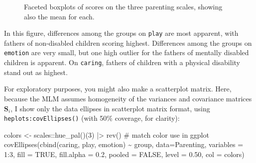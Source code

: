 \documentclass[
  letterpaper,
  10pt,
  krantz2]{krantz}
\makeatletter
\newenvironment{Shaded}{\begin{snugshade}}{\end{snugshade}}
\newcommand{\AttributeTok}[1]{\textcolor[rgb]{0.40,0.45,0.13}{#1}}
\newcommand{\CommentTok}[1]{\textcolor[rgb]{0.37,0.37,0.37}{#1}}
\newcommand{\ConstantTok}[1]{\textcolor[rgb]{0.56,0.35,0.01}{#1}}
\newcommand{\DecValTok}[1]{\textcolor[rgb]{0.68,0.00,0.00}{#1}}
\newcommand{\FloatTok}[1]{\textcolor[rgb]{0.68,0.00,0.00}{#1}}
\newcommand{\FunctionTok}[1]{\textcolor[rgb]{0.28,0.35,0.67}{#1}}
\newcommand{\NormalTok}[1]{\textcolor[rgb]{0.00,0.23,0.31}{#1}}
\newcommand{\OtherTok}[1]{\textcolor[rgb]{0.00,0.23,0.31}{#1}}
\newcommand{\SpecialCharTok}[1]{\textcolor[rgb]{0.37,0.37,0.37}{#1}}
\newenvironment{kframe}{%
  \medskip{}
  \setlength{\fboxsep}{.8em}
  \def\at@end@of@kframe{}%
  \ifinner\ifhmode%
  \def\at@end@of@kframe{\end{minipage}}%
  \begin{minipage}{\columnwidth}%
  \fi\fi%
  \def\FrameCommand##1{\hskip\@totalleftmargin \hskip-\fboxsep
  \colorbox{shadecolor}{##1}\hskip-\fboxsep
      \hskip-\linewidth \hskip-\@totalleftmargin \hskip\columnwidth}%
  \MakeFramed {\advance\hsize-\width
    \@totalleftmargin\z@ \linewidth\hsize
    \@setminipage}}%
{\par\unskip\endMakeFramed%
  \at@end@of@kframe}
\renewenvironment{Shaded}{\begin{kframe}}{\end{kframe}}
\makeatother
\begin{document}
\begin{figure}[H]


\caption{\label{fig-parenting-boxpl}Faceted boxplots of scores on the
three parenting scales, showing also the mean for each.}

\end{figure}%

In this figure, differences among the groups on \texttt{play} are most
apparent, with fathers of non-disabled children scoring highest.
Differences among the groups on \texttt{emotion} are very small, but one
high outlier for the fathers of mentally disabled children is apparent.
On \texttt{caring}, fathers of children with a physical disability stand
out as highest.

For exploratory purposes, you might also make a scatterplot matrix.
Here, because the MLM assumes homogeneity of the variances and
covariance matrices \(\mathbf{S}_i\), I show only the data ellipses in
scatterplot matrix format, using \texttt{heplots:covEllipses()} (with
50\% coverage, for clarity):

\begin{Shaded}
\begin{Highlighting}[]
\NormalTok{colors }\OtherTok{\textless{}{-}}\NormalTok{ scales}\SpecialCharTok{::}\FunctionTok{hue\_pal}\NormalTok{()(}\DecValTok{3}\NormalTok{) }\SpecialCharTok{|\textgreater{}} \FunctionTok{rev}\NormalTok{()  }\CommentTok{\# match color use in ggplot}
\FunctionTok{covEllipses}\NormalTok{(}\FunctionTok{cbind}\NormalTok{(caring, play, emotion) }\SpecialCharTok{\textasciitilde{}}\NormalTok{ group, }\AttributeTok{data=}\NormalTok{Parenting,}
  \AttributeTok{variables =} \DecValTok{1}\SpecialCharTok{:}\DecValTok{3}\NormalTok{,}
  \AttributeTok{fill =} \ConstantTok{TRUE}\NormalTok{, }\AttributeTok{fill.alpha =} \FloatTok{0.2}\NormalTok{,}
  \AttributeTok{pooled =} \ConstantTok{FALSE}\NormalTok{,}
  \AttributeTok{level =} \FloatTok{0.50}\NormalTok{, }
  \AttributeTok{col =}\NormalTok{ colors)}
\end{Highlighting}
\end{Shaded}
\end{document}
